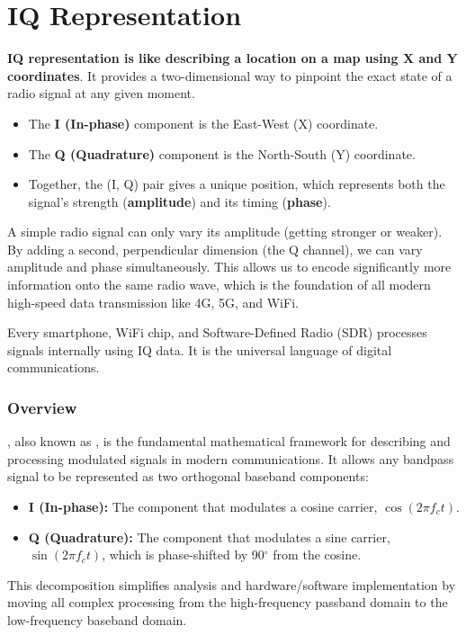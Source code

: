
\chapter{IQ Representation}
\label{ch:iq}

\begin{nontechnical}
    \textbf{IQ representation is like describing a location on a map using X and Y coordinates}. It provides a two-dimensional way to pinpoint the exact state of a radio signal at any given moment.

    \begin{itemize}
        \item The \textbf{I (In-phase)} component is the East-West (X) coordinate.
        \item The \textbf{Q (Quadrature)} component is the North-South (Y) coordinate.
        \item Together, the (I, Q) pair gives a unique position, which represents both the signal's strength (\textbf{amplitude}) and its timing (\textbf{phase}).
    \end{itemize}

     A simple radio signal can only vary its amplitude (getting stronger or weaker). By adding a second, perpendicular dimension (the Q channel), we can vary amplitude and phase simultaneously. This allows us to encode significantly more information onto the same radio wave, which is the foundation of all modern high-speed data transmission like 4G, 5G, and WiFi.

     Every smartphone, WiFi chip, and Software-Defined Radio (SDR) processes signals internally using IQ data. It is the universal language of digital communications.
\end{nontechnical}


\subsection{Overview}

, also known as , is the fundamental mathematical framework for describing and processing modulated signals in modern communications. It allows any bandpass signal to be represented as two orthogonal baseband components:
\begin{itemize}
    \item \textbf{I (In-phase):} The component that modulates a cosine carrier, $\cos(2\pi f_c t)$.
    \item \textbf{Q (Quadrature):} The component that modulates a sine carrier, $\sin(2\pi f_c t)$, which is phase-shifted by 90$^\circ$ from the cosine.
\end{itemize}
This decomposition simplifies analysis and hardware/software implementation by moving all complex processing from the high-frequency passband domain to the low-frequency baseband domain.

